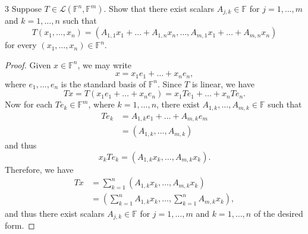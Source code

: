 \documentclass{extarticle}
\newenvironment{problem}[1]{\begin{prob*}{#1}{}}{\end{prob*}}
\newcommand{\F}{\mathbb{F}}
\newcommand{\Hom}{\mathcal{L}}
\begin{document}
\begin{problem}{3}
Suppose $T\in \Hom(\F^n,\F^m)$.  Show that there exist scalars $A_{j,k}\in\F$ for $j=1,\dots,m$ and $k=1,\dots,n$ such that
\begin{equation*}
T(x_1,\dots,x_n) = (A_{1,1}x_1 + \dots + A_{1,n}x_n,\dots, A_{m,1}x_1 + \dots + A_{m,n}x_n)
\end{equation*}
for every $(x_1,\dots,x_n)\in\F^n$.
\end{problem}
\begin{proof}
Given $x\in\F^n$, we may write
\begin{equation*}
x = x_1 e_1 + \dots + x_n e_n,
\end{equation*}
where $e_1,\dots,e_n$ is the standard basis of $\F^n$.  Since $T$ is linear, we have
\begin{equation*}
Tx = T(x_1 e_1 + \dots +x_n e_n) = x_1 Te_1 + \dots + x_n Te_n.
\end{equation*}
Now for each $Te_k\in\F^m$, where $k=1,\dots, n$, there exist $A_{1,k},\dots, A_{m,k}\in\F$ such that
\begin{align*}
Te_k &= A_{1,k}e_1 + \dots + A_{m,k}e_m\\
        &= \left(A_{1,k}, \dots, A_{m,k}\right)
\end{align*}
and thus 
\begin{equation*}
x_kTe_k = \left(A_{1,k}x_k, \dots, A_{m,k}x_k\right).
\end{equation*}
Therefore, we have
\begin{align*}
Tx &= \sum_{k = 1}^n \left(A_{1,k}x_k, \dots, A_{m,k}x_k\right)\\
     &= \left(\sum_{k = 1}^nA_{1,k}x_k, \dots, \sum_{k = 1}^nA_{m,k}x_k \right),
\end{align*}
and thus there exist scalars $A_{j,k}\in\F$ for $j=1,\dots,m$ and $k=1,\dots,n$ of the desired form.
\end{proof}
\end{document}
